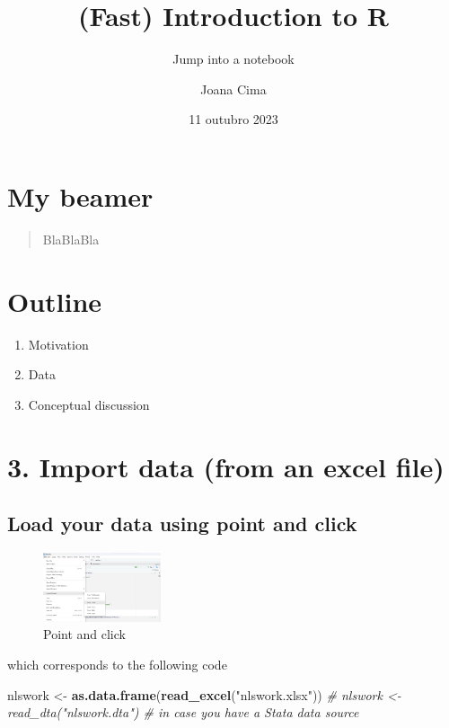 \documentclass[
]{article}
\title{(Fast) Introduction to R}
\subtitle{Jump into a notebook}
\author{Joana Cima}
\date{11 outubro 2023}
\newenvironment{Shaded}{\begin{snugshade}}{\end{snugshade}}
\newcommand{\CommentTok}[1]{\textcolor[rgb]{0.56,0.35,0.01}{\textit{#1}}}
\newcommand{\FunctionTok}[1]{\textcolor[rgb]{0.13,0.29,0.53}{\textbf{#1}}}
\newcommand{\NormalTok}[1]{#1}
\newcommand{\OtherTok}[1]{\textcolor[rgb]{0.56,0.35,0.01}{#1}}
\newcommand{\StringTok}[1]{\textcolor[rgb]{0.31,0.60,0.02}{#1}}
\providecommand{\tightlist}{%
  \setlength{\itemsep}{0pt}\setlength{\parskip}{0pt}}
\begin{document}
\maketitle

\hypertarget{my-beamer}{%
\section{My beamer}\label{my-beamer}}

\begin{quote}
BlaBlaBla
\end{quote}

\hypertarget{outline}{%
\section{Outline}\label{outline}}

\begin{enumerate}
\def\labelenumi{\arabic{enumi}.}
\tightlist
\item
  Motivation
\item
  Data
\item
  Conceptual discussion
\end{enumerate}

\hypertarget{import-data-from-an-excel-file}{%
\section{3. Import data (from an excel
file)}\label{import-data-from-an-excel-file}}

\hypertarget{load-your-data-using-point-and-click}{%
\subsection{Load your data using point and
click}\label{load-your-data-using-point-and-click}}

\begin{figure}
\centering
\includegraphics[width=0.31\textwidth,height=\textheight]{importdataset.png}
\caption{Point and click}
\end{figure}

which corresponds to the following code

\begin{Shaded}
\begin{Highlighting}[]
\NormalTok{nlswork }\OtherTok{\textless{}{-}} \FunctionTok{as.data.frame}\NormalTok{(}\FunctionTok{read\_excel}\NormalTok{(}\StringTok{"nlswork.xlsx"}\NormalTok{))}
\CommentTok{\# nlswork \textless{}{-} read\_dta("nlswork.dta") \# in case you have a Stata data source}
\end{Highlighting}
\end{Shaded}
\end{document}
